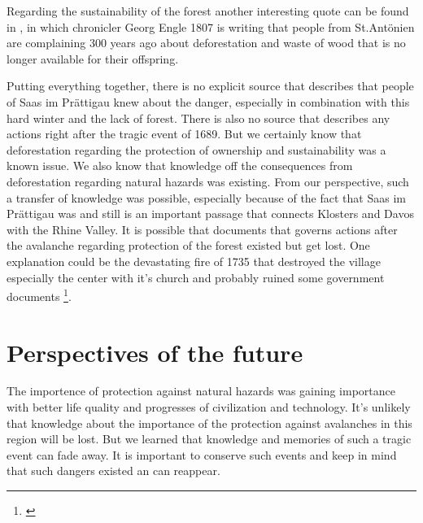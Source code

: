 \documentclass[12pt, a4paper]{article}
\begin{document}
Regarding the sustainability of the forest another interesting quote can be found in \citet[p.~7]{finze1988geschichte}, in which 	chronicler Georg Engle 1807 is writing that people from St.Antönien are complaining 300 years ago about deforestation and waste of wood that is no longer available for their offspring. 

Putting everything together, there is no explicit source that describes that people of Saas im Prättigau knew about the danger, especially in combination with this hard winter and the lack of forest. There is also no source that describes any actions right after the tragic event of 1689. But we certainly know that deforestation regarding the protection of ownership and sustainability was a known issue. We also know that knowledge off the consequences from deforestation regarding natural hazards was existing. From our perspective, such a transfer of knowledge was possible, especially because of the fact that Saas im Prättigau was and still is an important passage that connects Klosters and Davos with the Rhine Valley. It is possible that documents that governs actions after the avalanche regarding protection of the forest existed but get lost. One explanation could be the devastating fire of 1735 that destroyed the village especially the center with it's church and probably ruined some government documents \footnote{\citet[p.~55]{hansemann1995saaser}}. 

\section*{Perspectives of the future}
The importence of protection against natural hazards was gaining importance with better life quality and progresses of civilization and technology. It's unlikely that knowledge about the importance of the protection against avalanches in this region will be lost. But we learned that knowledge and memories of such a tragic event can fade away. It is important to conserve such events and keep in mind that such dangers existed an can reappear.


\end{document}
